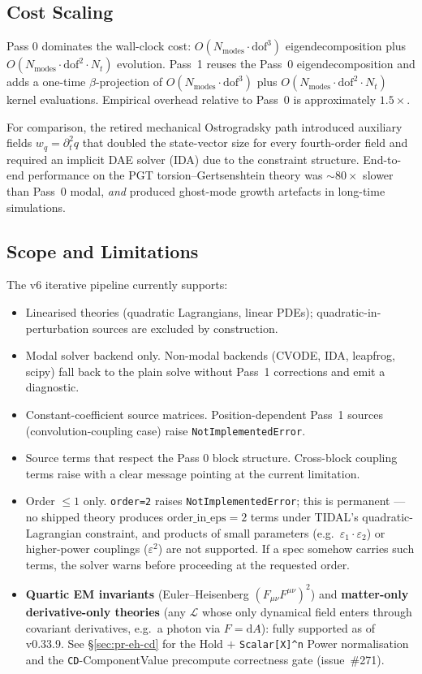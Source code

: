 \subsection{Cost Scaling}

Pass 0 dominates the wall-clock cost: $O(N_{\mathrm{modes}} \cdot \mathrm{dof}^3)$ eigendecomposition plus $O(N_{\mathrm{modes}} \cdot \mathrm{dof}^2 \cdot N_t)$ evolution. Pass~1 reuses the Pass~0 eigendecomposition and adds a one-time $\beta$-projection of $O(N_{\mathrm{modes}} \cdot \mathrm{dof}^3)$ plus $O(N_{\mathrm{modes}} \cdot \mathrm{dof}^2 \cdot N_t)$ kernel evaluations. Empirical overhead relative to Pass~0 is approximately $1.5\times$.

For comparison, the retired mechanical Ostrogradsky path introduced auxiliary fields $w_q = \partial_t^2 q$ that doubled the state-vector size for every fourth-order field and required an implicit DAE solver (IDA) due to the constraint structure. End-to-end performance on the PGT torsion--Gertsenshtein theory was $\sim\!80\times$ slower than Pass~0 modal, \emph{and} produced ghost-mode growth artefacts in long-time simulations.

\subsection{Scope and Limitations}
\label{sec:pr-scope}

The v6 iterative pipeline currently supports:
\begin{itemize}
  \item Linearised theories (quadratic Lagrangians, linear PDEs); quadratic-in-perturbation sources are excluded by construction.
  \item Modal solver backend only. Non-modal backends (CVODE, IDA, leapfrog, scipy) fall back to the plain solve without Pass~1 corrections and emit a diagnostic.
  \item Constant-coefficient source matrices. Position-dependent Pass~1 sources (convolution-coupling case) raise \verb|NotImplementedError|.
  \item Source terms that respect the Pass 0 block structure. Cross-block coupling terms raise with a clear message pointing at the current limitation.
  \item Order $\leq 1$ only. \verb|order=2| raises \verb|NotImplementedError|; this is permanent — no shipped theory produces $\mathrm{order\_in\_eps} = 2$ terms under TIDAL's quadratic-Lagrangian constraint, and products of small parameters (e.g.\ $\varepsilon_1 \cdot \varepsilon_2$) or higher-power couplings ($\varepsilon^2$) are not supported. If a spec somehow carries such terms, the solver warns before proceeding at the requested order.
  \item \textbf{Quartic EM invariants} (Euler--Heisenberg $(F_{\mu\nu}F^{\mu\nu})^2$) and \textbf{matter-only derivative-only theories} (any $\mathcal{L}$ whose only dynamical field enters through covariant derivatives, e.g.\ a photon via $F = \mathrm{d}A$): fully supported as of v0.33.9. See \S\ref{sec:pr-eh-cd} for the Hold $+$ \texttt{Scalar[X]\textasciicircum n} Power normalisation and the \texttt{CD}-ComponentValue precompute correctness gate (issue~\#271).
\end{itemize}

